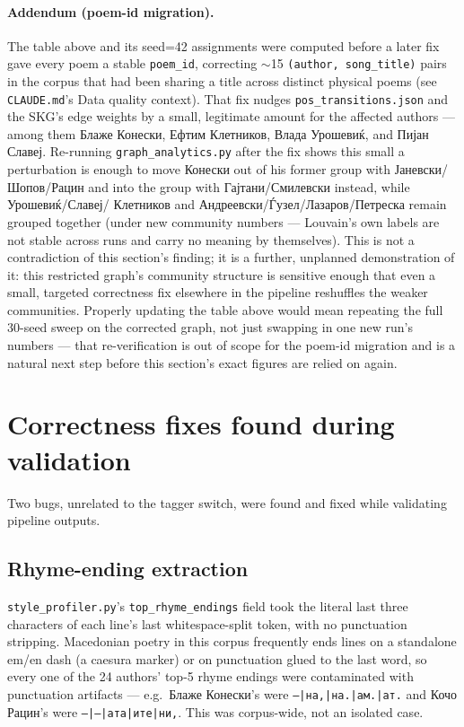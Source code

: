 \documentclass[11pt]{article}
\begin{document}
\paragraph{Addendum (poem-id migration).} The table above and its seed=42
assignments were computed before a later fix gave every poem a stable
\texttt{poem\_id}, correcting $\sim$15 \texttt{(author, song\_title)} pairs
in the corpus that had been sharing a title across distinct physical poems
(see \texttt{CLAUDE.md}'s Data quality context). That fix nudges
\texttt{pos\_transitions.json} and the SKG's edge weights by a small,
legitimate amount for the affected authors — among them Блаже Конески,
Ефтим Клетников, Влада Урошевиќ, and Пијан Славеј. Re-running
\texttt{graph\_analytics.py} after the fix shows this small a perturbation
is enough to move Конески out of his former group with Јаневски/Шопов/Рацин
and into the group with Гајтани/Смилевски instead, while Урошевиќ/Славеј/
Клетников and Андреевски/Ѓузел/Лазаров/Петреска remain grouped together
(under new community numbers — Louvain's own labels are not stable across
runs and carry no meaning by themselves). This is not a contradiction of
this section's finding; it is a further, unplanned demonstration of it:
this restricted graph's community structure is sensitive enough that even a
small, targeted correctness fix elsewhere in the pipeline reshuffles the
weaker communities. Properly updating the table above would mean repeating
the full 30-seed sweep on the corrected graph, not just swapping in one new
run's numbers — that re-verification is out of scope for the poem-id
migration and is a natural next step before this section's exact figures
are relied on again.

\section{Correctness fixes found during validation}

Two bugs, unrelated to the tagger switch, were found and fixed while
validating pipeline outputs.

\subsection{Rhyme-ending extraction}

\texttt{style\_profiler.py}'s \texttt{top\_rhyme\_endings} field took the
literal last three characters of each line's last whitespace-split token,
with no punctuation stripping. Macedonian poetry in this corpus frequently
ends lines on a standalone em/en dash (a caesura marker) or on punctuation
glued to the last word, so every one of the 24 authors' top-5 rhyme endings
were contaminated with punctuation artifacts — e.g.\ Блаже Конески's were
\texttt{--|на,|на.|ам.|ат.} and Кочо Рацин's were
\texttt{--|---|ата|ите|ни,}. This was corpus-wide, not an isolated case.
\end{document}
